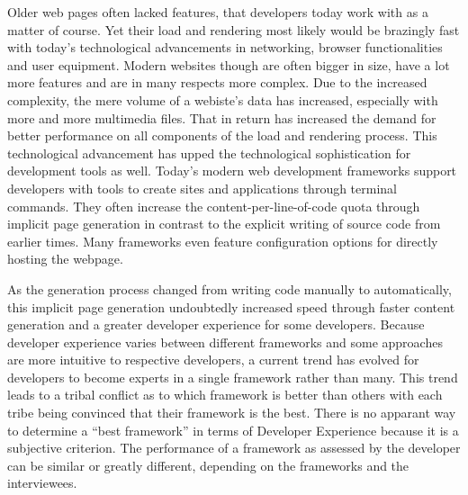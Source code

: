 \documentclass[a4paper, 12pt]{article}
\begin{document}
Older web pages often lacked features, that developers today work with as a matter of course.
Yet their load and rendering most likely would be brazingly fast with today's technological advancements in networking, browser functionalities and user equipment.
Modern websites though are often bigger in size, have a lot more features and are in many respects more complex.
Due to the increased complexity, the mere volume of a webiste's data has increased, especially with more and more multimedia files.
That in return has increased the demand for better performance on all components of the load and rendering process.
This technological advancement has upped the technological sophistication for development tools as well.
Today's modern web development frameworks support developers with tools to create sites and applications through terminal commands.
They often increase the content-per-line-of-code quota through implicit page generation in contrast to the explicit writing of source code from earlier times.
Many frameworks even feature configuration options for directly hosting the webpage.

As the generation process changed from writing code manually to automatically, this implicit page generation undoubtedly increased speed through faster content generation and a greater developer experience for some developers.
Because developer experience varies between different frameworks and some approaches are more intuitive to respective developers, a current trend has evolved for developers to become experts in a single framework rather than many.
This trend leads to a tribal conflict as to which framework is better than others with each tribe being convinced that their framework is the best.
There is no apparant way to determine a \enquote{best framework} in terms of Developer Experience because it is a subjective criterion.
The performance of a framework as assessed by the developer can be similar or greatly different, depending on the frameworks and the interviewees.
\end{document}
